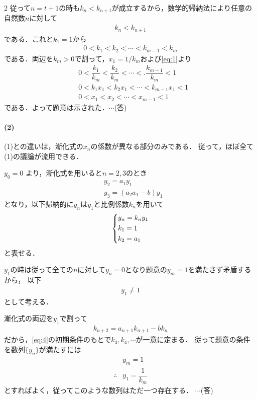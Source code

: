 \documentclass[../../main.tex]{subfiles}
\begin{document}
\begin{multicols}{2}
  従って$n=t+1$の時も$k_{n}<k_{n+1}$が成立するから，数学的帰納法により任意の自然数$n$に対して
  \begin{align}
    k_{n} < k_{n+1}
  \end{align}
  である．これと$k_1=1$から
  \begin{align}
    0< k_1 < k_2 < \cdots < k_{m-1} < k_m \label{eq:3}
  \end{align}
  である．両辺を$k_m>0$で割って，$x_1=1/k_m$および\cref{eq:1}より
  \begin{align}
    & 0< \dfrac{k_1}{k_m} < \dfrac{k_2}{k_m} < \cdots <.  \dfrac{k_{m-1}}{k_m} < 1 \\
    & 0< k_1x_1 < k_2x_1 < \cdots < k_{m-1}x_1 <  1                             \\
    & 0 < x_1 < x_2 < \cdots < x_{m-1} < 1
  \end{align}
  である．よって題意は示された．$\cdots$(答)

  \paragraph{(2)}
  (1)との違いは，漸化式の$x_n$の係数が異なる部分のみである．
  従って，ほぼ全て(1)の議論が流用できる．

  $y_0 = 0$ より，漸化式を用いると$n=2,3$のとき
  \begin{align}
    & y_2 = a_1 y_1           \\
    & y_3 = (a_2 a_1 - b) y_1
  \end{align}
  となり，以下帰納的に$y_n$は$y_1$と比例係数$k_n$を用いて
  \begin{align}
    \begin{dcases}
      y_n = k_n y_1 \\
      k_1 = 1       \\
      k_2 = a_1
    \end{dcases} \label{eq:4}
  \end{align}
  と表せる．

  $y_1$の時は従って全ての$n$に対して$y_n=0$となり題意の$y_m=1$を満たさず矛盾するから，
  以下
  \begin{align}
    y_1 \neq 1
  \end{align}
  として考える．

  漸化式の両辺を$y_1$で割って
  \begin{align}
    k_{n+2} = a_{n+1} k_{n+1} - b k_n \label{eq:5}
  \end{align}
  だから，\cref{eq:4}の初期条件のもとで$k_3,k_4,\cdots$が一意に定まる．
  従って題意の条件を数列$\{y_n\}$が満たすには
  \begin{align}
    & y_m = 1             \\
    \therefore
    & y_1 = \dfrac{1}{k_m}
  \end{align}
  とすればよく，従ってこのような数列はただ一つ存在する．  $\cdots$(答)


\end{multicols}
\end{document}
